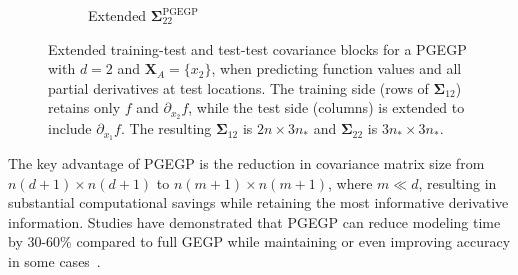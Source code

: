 \documentclass[12pt]{article}
\begin{document}
\begin{figure}[htbp]
\begin{subfigure}[t]{0.48\textwidth}
		\caption{Extended $\boldsymbol{\Sigma}^{\text{PGEGP}}_{22}$}
		\label{fig:pgegp_s22_deriv}
	\end{subfigure}
	\caption{Extended training-test and test-test covariance blocks for a PGEGP with $d=2$ and $\mathbf{X}_A = \{x_2\}$, when predicting function values and all partial derivatives at test locations. The training side (rows of $\boldsymbol{\Sigma}_{12}$) retains only $f$ and $\partial_{x_2} f$, while the test side (columns) is extended to include $\partial_{x_1} f$. The resulting $\boldsymbol{\Sigma}_{12}$ is $2n \times 3n_*$ and $\boldsymbol{\Sigma}_{22}$ is $3n_* \times 3n_*$.}
	\label{fig:pgegp_deriv_prediction}
\end{figure}

The key advantage of PGEGP is the reduction in covariance matrix size from $n(d+1) \times n(d+1)$ to $n(m+1) \times n(m+1)$, where $m \ll d$, resulting in substantial computational savings while retaining the most informative derivative information. Studies have demonstrated that PGEGP can reduce modeling time by 30-60\% compared to full GEGP while maintaining or even improving accuracy in some cases~\cite{CHEN201915}. 
\end{document}
